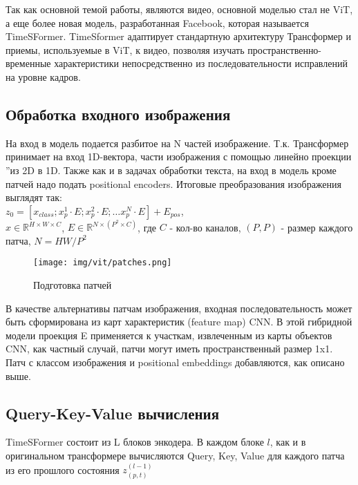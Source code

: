 \documentclass[PMI,KR]{HSEUniversity}
\begin{document}
Так как основной темой работы, являются видео, основной моделью стал не ViT, а еще более новая модель, разработанная Facebook, которая называется TimeSFormer. 
TimeSformer\cite{timesformer:2021} адаптирует стандартную архитектуру Трансформер и приемы, используемые в ViT, к видео, позволяя изучать пространственно-временные характеристики непосредственно из последовательности исправлений на уровне кадров. 

\subsection{Обработка входного изображения}

На вход в модель подается разбитое на N частей изображение. Т.к. Трансформер принимает на вход 1D-вектора,  части изображения с помощью линейно проекции \textquotedblright из 2D в 1D.
Также как и в задачах обработки текста, на вход в модель кроме патчей надо подать positional encoders.
Итоговые преобразования изображения выглядят так: \\

\noindent$z_{0} = [x_{class}; x^1_{p} \cdot E; x^2_{p} \cdot E; \dots x^N_{p} \cdot E] + E_{pos} $,\\
$x \in \mathds{R}^{H \times W \times C}$, $E \in \mathds{R}^{N \times (P^{2} \times C)}$,
где $C$ - кол-во каналов, $(P, P)$ - размер каждого патча, $N = HW / P^2$

\begin{figure}[h]
    \centering
    \texttt{[image: img/vit/patches.png]}
    \caption{Подготовка патчей}
\end{figure}

В качестве альтернативы патчам изображения, входная последовательность может быть сформирована
из карт характеристик (feature map) CNN. В этой гибридной модели проекция E применяется к участкам, извлеченным из карты объектов CNN, как частный случай, патчи могут иметь пространственный размер 1x1.
Патч с классом изображения и positional embeddings добавляются, как описано выше.


\subsection{Query-Key-Value вычисления}

TimeSFormer состоит из L блоков энкодера. В каждом блоке $l$, как и в оригинальном трансформере вычисляются Query, Key, Value для каждого патча из его прошлого состояния $z_{(p, t)}^{(l-1)}$
\end{document}
